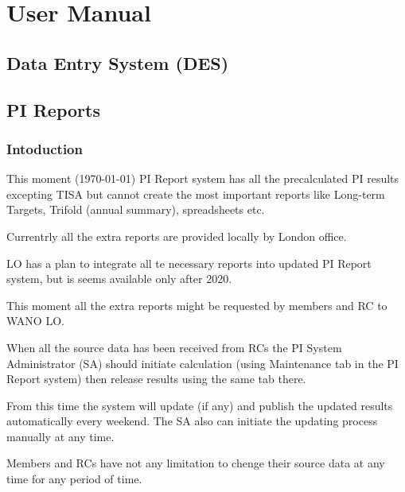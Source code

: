 \section{User Manual}
\subsection{Data Entry System (DES)}



\subsection{PI Reports}
\subsubsection{Intoduction}

This moment (\today) PI Report system has all the precalculated
PI results excepting TISA but cannot create the most important reports
like Long-term Targets, Trifold (annual summary), spreadsheets etc.

Currentrly all the extra reports are provided locally by London
office.

LO has a plan to integrate all te necessary reports into updated PI
Report system, but is seems available only after 2020.

This moment all the extra reports might be requested by members and RC
to WANO LO.

When all the source data has been received from RCs the PI System
Administrator (SA) should initiate calculation (using Maintenance tab in
the PI Report system) then release results using the same tab there.

From this time the system will update (if any) and publish the updated
results automatically every weekend. The SA also can initiate the
updating process manually at any time.

Members and RCs have not any limitation to chenge their source data at
any time for any period of time.